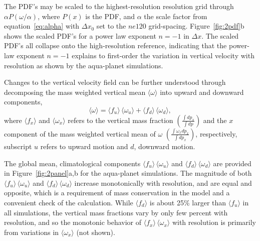\documentclass[times]{qjrms4}
\begin{document}
The PDF's may be scaled to the highest-resolution resolution grid through $ \alpha P (\omega / \alpha)$, where $P(x)$ is the PDF, and $\alpha$ the scale factor from equation~\ref{eq:alpha} with $\Delta x_0$ set to the $ne120$ grid-spacing. Figure~\ref{fig:2pdf}b shows the scaled PDF's for a power law exponent $n=-1$ in $\Delta x$. The scaled PDF's all collapse onto the high-resolution reference, indicating that the power-law exponent $n=-1$ explains to first-order the variation in vertical velocity with resolution as shown by the aqua-planet simulations. 

Changes to the vertical velocity field can be further understood through decomposing the mass weighted vertical mean $ \langle \omega \rangle$ into upward and downward components,
\begin{equation}
\langle \omega \rangle =\langle f_{u} \rangle \, \langle \omega_{u} \rangle + \langle f_{d} \rangle \, \langle \omega_{d} \rangle, \label{eq:omega}
\end{equation}
where $\langle f_x \rangle$ and $\langle \omega_x \rangle$ refers to the vertical mass fraction $ \left( \frac{\int dp_x}{\int dp} \right)$ and the $x$ component of the mass weighted vertical mean of $\omega$ $ \left( \frac{\int \omega_x dp_x}{\int dp_x} \right)$, respectively, subscript $u$ refers to upward motion and $d$, downward motion.

The global mean, climatological components $\langle f_{u} \rangle \, \langle \omega_{u} \rangle$ and $\langle f_{d} \rangle \, \langle \omega_{d} \rangle$ are provided in Figure~\ref{fig:2panel}a,b for the aqua-planet simulations. The magnitude of both $\langle f_{u} \rangle \, \langle \omega_{u} \rangle$ and $\langle f_{d} \rangle \, \langle \omega_{d} \rangle$ increase monotonically with resolution, and are equal and opposite, which is a requirement of mass conservation in the model and a convenient check of the calculation. While $\langle f_{d} \rangle$ is about 25\% larger than $\langle f_{u} \rangle$ in all simulations, the vertical mass fractions vary by only few percent with resolution, and so the monotonic behavior of $\langle f_{x} \rangle \, \langle \omega_{x} \rangle$ with resolution is primarily from variations in $ \langle \omega_{x} \rangle$ (not shown).
\end{document}
